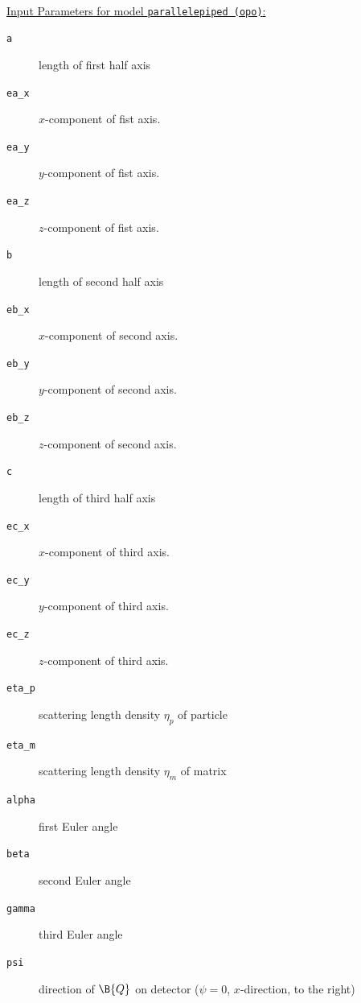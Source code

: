 ~\\
\underline{Input Parameters for model \texttt{parallelepiped (opo)}:}
\begin{description}
\item[\texttt{a}] length of first half axis
\item[\texttt{ea\_x}] $x$-component of fist axis.
\item[\texttt{ea\_y}] $y$-component of fist axis.
\item[\texttt{ea\_z}] $z$-component of fist axis.
\item[\texttt{b}] length of second half axis
\item[\texttt{eb\_x}] $x$-component of second axis.
\item[\texttt{eb\_y}] $y$-component of second axis.
\item[\texttt{eb\_z}] $z$-component of second axis.
\item[\texttt{c}] length of third half axis
\item[\texttt{ec\_x}] $x$-component of third axis.
\item[\texttt{ec\_y}] $y$-component of third axis.
\item[\texttt{ec\_z}] $z$-component of third axis.
\item[\texttt{eta\_p}] scattering length density $\eta_p$ of particle
\item[\texttt{eta\_m}] scattering length density $\eta_m$ of matrix
\item[\texttt{alpha}] first Euler angle
\item[\texttt{beta}] second Euler angle
\item[\texttt{gamma}] third Euler angle
\item[\texttt{psi}] direction of $\B{Q}$ on detector ($\psi=0$, $x$-direction, to the right)
\end{description}

